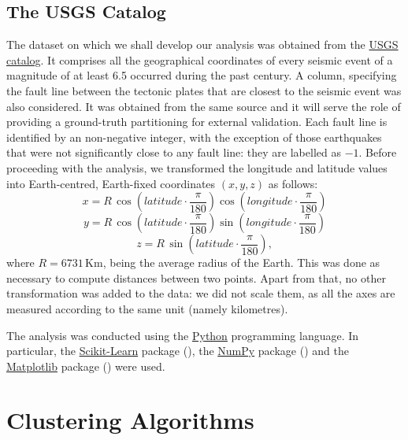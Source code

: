 \documentclass[a4paper]{article}
\begin{document}
	\subsection{The USGS Catalog}
	The dataset on which we shall develop our analysis was obtained from the \href{https://earthquake.usgs.gov/earthquakes/search/}{USGS catalog}. It comprises all the geographical coordinates of every seismic event of a magnitude of at least 6.5 occurred during the past century. A column, specifying the fault line between the tectonic plates that are closest to the seismic event was also considered. It was obtained from the same source and it will serve the role of providing a ground-truth partitioning for external validation. Each fault line is identified by an non-negative integer, with the exception of those earthquakes that were not significantly close to any fault line: they are labelled as $-1$.
	Before proceeding with the analysis, we transformed the longitude and latitude values into Earth-centred, Earth-fixed coordinates $\left(x,y,z\right)$ as follows:
	\begin{equation*}
	x = R \, \cos\left(latitude \cdot \frac{\pi}{180}\right) \cos\left(longitude \cdot \frac{\pi}{180} \right)
	\end{equation*}
	\begin{equation*}
	y = R \, \cos\left(latitude \cdot \frac{\pi}{180}\right) \sin\left(longitude \cdot \frac{\pi}{180} \right)
	\end{equation*}
	\begin{equation*}
	z = R \, \sin\left(latitude \cdot \frac{\pi}{180}\right),
	\end{equation*}
	where $R = 6731 \, \mathrm{Km}$, being the average radius of the Earth. This was done as necessary to compute distances between two points.
	Apart from that, no other transformation was added to the data: we did not scale them, as all the axes are measured according to the same unit (namely kilometres).

	The analysis was conducted using the \href{https://www.python.org/}{Python} programming language. In particular, the \href{http://scikit-learn.org/stable/}{Scikit-Learn} package (\cite{scikit-learn}), the \href{http://www.numpy.org/}{NumPy} package (\cite{doi:10.1109/MCSE.2011.37}) and the \href{https://matplotlib.org/}{Matplotlib} package (\cite{Hunter_2007}) were used.
	\section{Clustering Algorithms}
\end{document}
